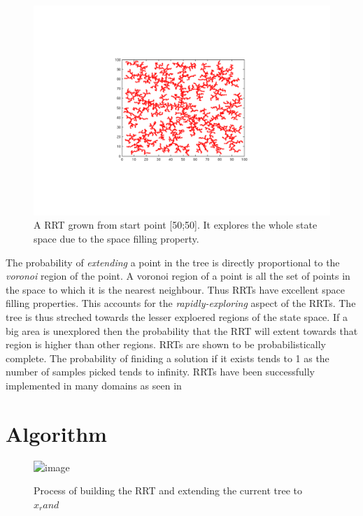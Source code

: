 \documentclass[MTech]{iitmdiss}
\begin{document}
  \begin{figure}[htpb]
   \begin{center}
   \includegraphics[scale=0.45] {rrt-basic}
     \caption { A RRT grown from start point [50;50]. It explores the whole state space due to the space filling property.}
   \label{fig:rrt-basic}
   \end{center}
 \end{figure}

The probability of \emph{extending} a point in the tree is directly proportional to the \emph{voronoi} region of the point. A voronoi region of a point is all the set of points in the space to which it is the nearest neighbour. Thus RRTs have excellent space filling properties. This accounts for the \emph{rapidly-exploring} aspect of the RRTs. The tree is thus streched towards the lesser exploered regions of the state space. If a big area is unexplored then the probability that the RRT will extent towards that region is higher than other regions. RRTs are shown to be probabilistically complete. The probability of finiding a solution if it exists tends to 1 as the number of samples picked tends to infinity. RRTs have been successfully implemented in many domains as seen in \cite{lav01, bruce02, kuffner03, kim03, oriolo04}

\section{Algorithm}
 \begin{figure}[htpb]
   \begin{center}
     \resizebox{75mm}{75mm} {\includegraphics *{rrt}}
     \caption {Process of building the RRT and extending the current tree to $x_rand$}
   \label{fig:rrt-extend}
   \end{center}
 \end{figure}
\end{document}
